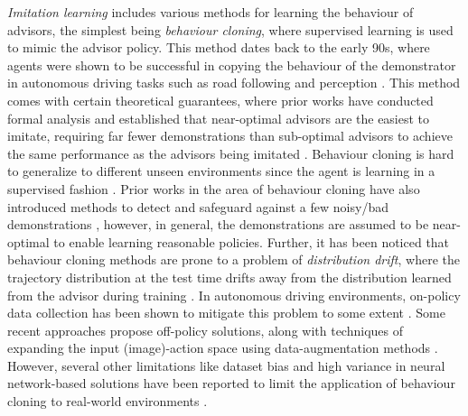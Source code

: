 \documentclass[jair, twoside,11pt,theapa]{article}
\begin{document}
\textit{Imitation learning} includes various methods for learning the behaviour of advisors, 
the simplest being \textit{behaviour cloning}, where supervised learning is used to mimic the advisor policy. This method dates back to the early 90s, where agents were shown to be successful in copying the behaviour of the demonstrator in autonomous driving tasks such as road following and perception \citep{pomerleau1998autonomous, pomerleau1991efficient}. This method comes with certain theoretical guarantees, where prior works have conducted formal analysis and established that near-optimal advisors are the easiest to imitate, requiring far fewer demonstrations than sub-optimal advisors to achieve the same performance as the advisors being imitated \citep{syed2010reduction}. Behaviour cloning is hard to generalize to different unseen environments since the agent is learning in a supervised fashion \citep{kiran2021deep}. Prior works in the area of behaviour cloning have also introduced methods to detect and safeguard against a few noisy/bad demonstrations \citep{zheng2014robust, hussein2021robust}, however, in general, the demonstrations are assumed to be near-optimal to enable learning reasonable policies.  Further, it has been noticed that behaviour cloning methods are prone to a problem of \emph{distribution drift}, where the trajectory distribution at the test time drifts away from the distribution learned from the advisor during training \citep{ross2011reduction, rajeswaran2017learning}.  In autonomous driving environments, on-policy data collection has been shown to mitigate this problem to some extent \citep{santana2016learning}. Some recent approaches propose off-policy solutions, along with techniques of expanding the input (image)-action space using data-augmentation methods \citep{codevilla2018end, laskey2017dart}. However, several other limitations like dataset bias and high variance in neural network-based solutions have been reported to limit the application of behaviour cloning to real-world environments \citep{codevilla2019exploring}. 
\end{document}
